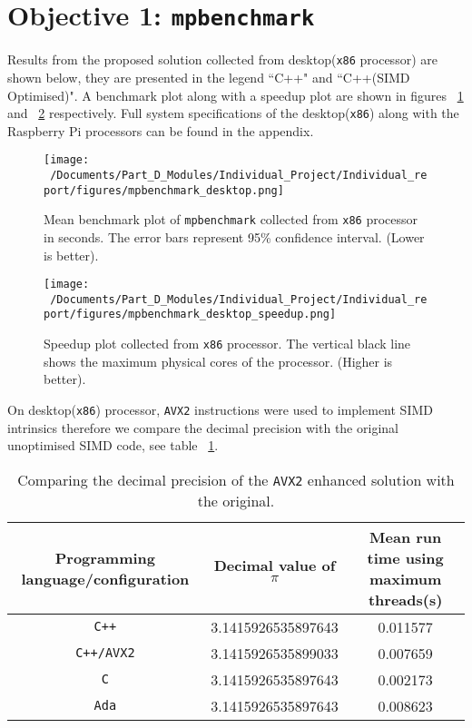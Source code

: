 \section{Objective 1: \texttt{mpbenchmark}}

Results from the proposed solution collected from desktop(\texttt{x86} processor) are shown below, they are presented in the legend ``C++" and ``C++(SIMD Optimised)". A benchmark plot along with a speedup plot are shown in figures ~\ref{fig:mpbenchmark_desktop_plot} and ~\ref{fig:mpbenchmark_desktop_speedup_plot} respectively. Full system specifications of the desktop(\texttt{x86}) along with the Raspberry Pi processors can be found in the appendix.

\begin{figure}[htbp] %
	\centering
	\texttt{[image: ~/Documents/Part\_D\_Modules/Individual\_Project/Individual\_report/figures/mpbenchmark\_desktop.png]} %
	\caption{Mean benchmark plot of \texttt{mpbenchmark} collected from \texttt{x86} processor in seconds. The error bars represent 95\% confidence interval. (Lower is better).}
	\label{fig:mpbenchmark_desktop_plot} %
\end{figure}


\begin{figure}[htbp] %
	\centering
	\texttt{[image: ~/Documents/Part\_D\_Modules/Individual\_Project/Individual\_report/figures/mpbenchmark\_desktop\_speedup.png]} %
	\caption{Speedup plot collected from \texttt{x86} processor. The vertical black line shows the maximum physical cores of the processor. (Higher is better).}
	\label{fig:mpbenchmark_desktop_speedup_plot} %
\end{figure}

On desktop(\texttt{x86}) processor, \texttt{AVX2} instructions were used to implement SIMD intrinsics therefore we compare the decimal precision with the original unoptimised SIMD code, see table ~\ref{tab:c++_avx2_pi}.

\begin{table}[htbp]
	\centering
	\begin{tabular}{|c|c|c|}
		\hline
		\textbf{Programming language/configuration} & \textbf{Decimal value of $\pi$} & \textbf{Mean run time using maximum threads(s)} \\ \hline
		\texttt{C++}             & 3.1415926535897643 & 0.011577 \\ \hline
		\texttt{C++/AVX2}   & 3.1415926535899033 &  0.007659  \\ \hline
		\texttt{C}                 & 3.1415926535897643 & 0.002173 \\ \hline
		\texttt{Ada}             & 3.1415926535897643 & 0.008623 \\ \hline
	\end{tabular}
	\label{tab:c++_avx2_pi}
	\caption{Comparing the decimal precision of the \texttt{AVX2} enhanced solution with the original.}
\end{table}

